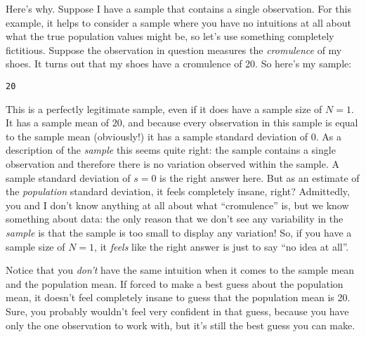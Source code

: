 Here's why. Suppose I have a sample that contains a single observation. For this example, it helps to consider a sample where you have no intuitions at all about what the true population values might be, so let's use something completely fictitious. Suppose the observation in question measures the {\it cromulence} of my shoes. It turns out that my shoes have a cromulence of 20. So here's my sample:
\begin{center}
\texttt{20}
\end{center}
This is a perfectly legitimate sample, even if it does have a sample size of $N=1$. It has a sample mean of 20, and because every observation in this sample is equal to the sample mean (obviously!) it has a sample standard deviation of 0. As a description of the {\it sample} this seems quite right: the sample contains a single observation and therefore there is no variation observed within the sample. A sample standard deviation of $s = 0$ is the right answer here. But as an estimate of the {\it population} standard deviation, it feels completely insane, right? Admittedly, you and I don't know anything at all about what ``cromulence'' is, but we know something about data: the only reason that we don't see any variability in the {\it sample} is that the sample is too small to display any variation! So, if you have a sample size of $N=1$, it {\it feels} like the right answer is just to say ``no idea at all''. 

Notice that you {\it don't} have the same intuition when it comes to the sample mean and the population mean. If forced to make a best guess about the population mean, it doesn't feel completely insane to guess that the population mean is 20. Sure, you probably wouldn't feel very confident in that guess, because you have only the one observation to work with, but it's still the best guess you can make. 


